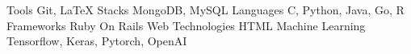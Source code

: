 



  \begin{cvskills}
  \cvskill
    {Tools}
    {Git, LaTeX} 
  \cvskill
    {Stacks}
    {MongoDB, MySQL}
  \cvskill
    {Languages}
    {C, Python, Java, Go, R}
  \cvskill
    {Frameworks}
    {Ruby On Rails}
  \cvskill
    {Web Technologies}
    {HTML}
  \cvskill
    {Machine Learning}
    {Tensorflow, Keras, Pytorch, OpenAI}
    

  \end{cvskills}


